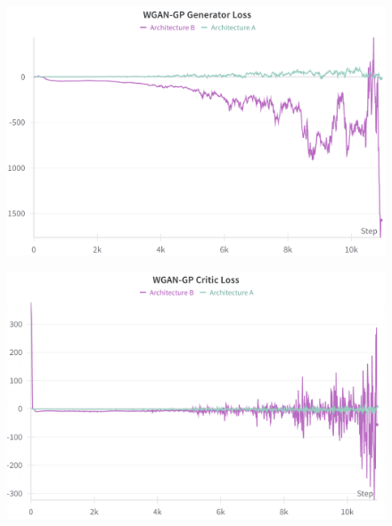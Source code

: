 \documentclass{article}
\begin{document}
\begin{figure}[ht]
    \begin{minipage}[b]{0.45\textwidth}
        \centering
        \includegraphics[width=\textwidth]{../src/gp_gen_loss.png}
        \label{fig:image5}
    \end{minipage}
    \hfill
    \begin{minipage}[b]{0.45\textwidth}
        \centering
        \includegraphics[width=\textwidth]{../src/gp_crit_loss.png}
        \label{fig:image6}
    \end{minipage}

\end{figure}
\end{document}
